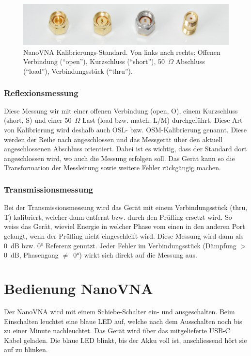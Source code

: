 \documentclass[twoside,a4paper,11pt,halfparskip,DIV=11,notitlepage]{scrartcl}
\newcommand{\Ohm}{$\Omega$\xspace}
\begin{document}
\begin{figure}[t]
    \includegraphics[width=\textwidth]{figures/calkit.jpg}
    \caption{NanoVNA Kalibrierungs-Standard. Von links nach rechts:
        Offenen Verbindung (``open''), Kurzschluss (``short''),
    50~\Ohm Abschluss (``load''), Verbindungsstück (``thru'').}
    \label{fig:calkit}
\end{figure}

\subsubsection{Reflexionsmessung}
Diese Messung wir mit einer offenen Verbindung (open, O), einem Kurzschluss
(short, S) und einer 50~\Ohm Last (load bzw. match, L/M) durchgeführt. Diese Art von
Kalibrierung wird deshalb auch OSL- bzw. OSM-Kalibrierung genannt. Diese
werden der Reihe nach angeschlossen und das Messgerät über den aktuell angeschlossenen
Abschluss orientiert. Dabei ist es wichtig, dass der Standard dort angeschlossen
wird, wo auch die Messung erfolgen soll. Das Gerät kann so die Transformation
der Messleitung sowie weitere Fehler rückgängig machen.

\subsubsection{Transmissionsmessung}
Bei der Transmissionsmessung wird das Gerät mit einem Verbindungsstück (thru, T) kalibriert,
welcher dann entfernt bzw. durch den Prüfling ersetzt wird. So weiss das  Gerät,
wieviel Energie in welcher Phase vom einen in den anderen Port gelangt, wenn der
Prüfling nicht eingeschleift wird. Diese Messung wird dann als 0~dB bzw. 0° Referenz
genutzt. Jeder Fehler im Verbindungsstück (Dämpfung $>$ 0~dB, Phasengang $\ne$~0°)
wirkt sich direkt auf die Messung aus.


\newpage %
\section{Bedienung NanoVNA}
Der NanoVNA wird mit einem Schiebe-Schalter ein- und ausgeschalten. Beim Einschalten
leuchtet eine blaue LED auf, welche nach dem Ausschalten noch bis zu einer Minute
nachleuchtet. Das Gerät wird über das mitgelieferte USB-C Kabel geladen. Die blaue
LED blinkt, bis der Akku voll ist, anschliessend hört sie auf zu blinken.
\end{document}
